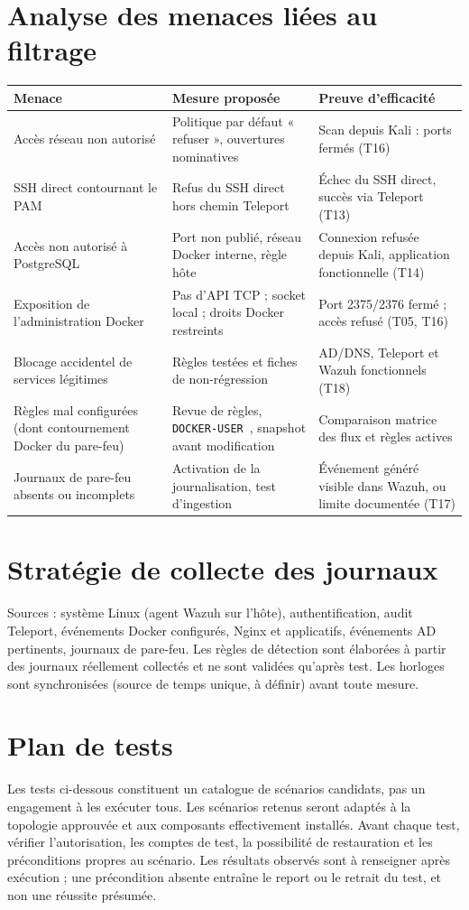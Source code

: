 \documentclass[11pt,a4paper]{report}
\begin{document}
\section{Analyse des menaces liées au filtrage}
\footnotesize
\begin{longtable}{@{}p{2.9cm}p{5.5cm}p{6.2cm}@{}}
\toprule\textbf{Menace} & \textbf{Mesure proposée} & \textbf{Preuve d'efficacité}\\ \midrule\endhead
Accès réseau non autorisé & Politique par défaut « refuser », ouvertures nominatives & Scan depuis Kali : ports fermés (T16)\\
SSH direct contournant le PAM & Refus du SSH direct hors chemin Teleport & Échec du SSH direct, succès via Teleport (T13)\\
Accès non autorisé à PostgreSQL & Port non publié, réseau Docker interne, règle hôte & Connexion refusée depuis Kali, application fonctionnelle (T14)\\
Exposition de l'administration Docker & Pas d'API TCP ; socket local ; droits Docker restreints & Port 2375/2376 fermé ; accès refusé (T05, T16)\\
Blocage accidentel de services légitimes & Règles testées et fiches de non-régression & AD/DNS, Teleport et Wazuh fonctionnels (T18)\\
Règles mal configurées (dont contournement Docker du pare-feu) & Revue de règles, \texttt{DOCKER-USER}~\cite{docker-fw}, snapshot avant modification & Comparaison matrice des flux et règles actives\\
Journaux de pare-feu absents ou incomplets & Activation de la journalisation, test d'ingestion & Événement généré visible dans Wazuh, ou limite documentée (T17)\\
\bottomrule
\end{longtable}
\normalsize

\section{Stratégie de collecte des journaux}
Sources : système Linux (agent Wazuh sur l'hôte), authentification, audit Teleport, événements Docker configurés, Nginx et applicatifs, événements AD pertinents, journaux de pare-feu. Les règles de détection sont élaborées à partir des journaux réellement collectés et ne sont validées qu'après test. Les horloges sont synchronisées (source de temps unique, à définir) avant toute mesure.

\section{Plan de tests}
Les tests ci-dessous constituent un catalogue de scénarios candidats, pas un engagement à les exécuter tous. Les scénarios retenus seront adaptés à la topologie approuvée et aux composants effectivement installés. Avant chaque test, vérifier l'autorisation, les comptes de test, la possibilité de restauration et les préconditions propres au scénario. Les résultats observés sont à renseigner après exécution ; une précondition absente entraîne le report ou le retrait du test, et non une réussite présumée.
\end{document}

